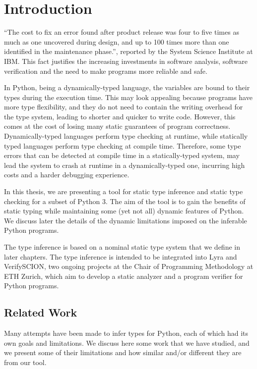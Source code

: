 
\chapter{Introduction}\label{chapter:introduction}

“The cost to fix an error found after product release was four to five times as much as one uncovered during design, and up to 100 times more than one identified in the maintenance phase.”, reported by the System Science Institute at IBM. This fact justifies the increasing investments in software analysis, software verification and the need to make programs more reliable and safe.

In Python, being a dynamically-typed language, the variables are bound to their types during the execution time. This may look appealing because programs have more type flexibility, and they do not need to contain the writing overhead for the type system, leading to shorter and quicker to write code. However, this comes at the cost of losing many static guarantees of program correctness. Dynamically-typed languages perform type checking at runtime, while statically typed languages perform type checking at compile time. Therefore, some type errors that can be detected at compile time in a statically-typed system, may lead the system to crash at runtime in a dynamically-typed one, incurring high costs and a harder debugging experience.

In this thesis, we are presenting a tool for static type inference and static type checking for a subset of Python 3. The aim of the tool is to gain the benefits of static typing while maintaining some (yet not all) dynamic features of Python. We discuss later the details of the dynamic limitations imposed on the inferable Python programs.

The type inference is based on a nominal static type system that we define in later chapters. The type inference is intended to be integrated into Lyra and VerifySCION, two ongoing projects at the Chair of Programming Methodology at ETH Zurich, which aim to develop a static analyzer and a program verifier for Python programs.

\section{Related Work}
Many attempts have been made to infer types for Python, each of which had its own goals and limitations. We discuss here some work that we have studied, and we present some of their limitations and how similar and/or different they are from our tool.

